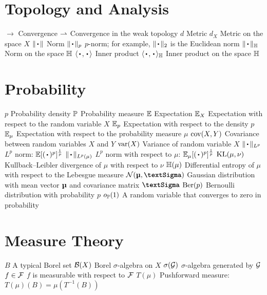 \documentclass[12pt]{report}
\begin{document}
\section*{Topology and Analysis}
\entry
    {$\to$}
    {Convergence}
\entry
    {$\weakto$}
    {Convergence in the weak topology}
\entry
    {$d$}
    {Metric}
\entry
    {$d_X$}
    {Metric on the space $X$}
\entry
    {$\norm{\vardot}$}
    {Norm}
\entry
    {$\norm{\vardot}_p$}
    {$p$-norm; for example, $\norm{\vardot}_2$ is the Euclidean norm}
\entry
    {$\norm{\vardot}_\Hb$}
    {Norm on the space $\Hb$}
\entry
    {$\lra{\vardot,\vardot}$}
    {Inner product}
\entry
    {$\lra{\vardot,\vardot}_\Hb$}
    {Inner product on the space $\Hb$}

\section*{Probability}
\entry
    {$p$}
    {Probability density}
\entry
    {$\P$}
    {Probability measure}
\entry
    {$\E$}
    {Expectation}
\entry
    {$\E_X$}
    {Expectation with respect to the random variable $X$}
\entry
    {$\E_p$}
    {Expectation with respect to the density $p$}
\entry
    {$\E_\mu$}
    {Expectation with respect to the probability measure $\mu$}
\entry
    {$\cov(X, Y)$}
    {Covariance between random variables $X$ and $Y$}
\entry
    {$\var(X)$}
    {Variance of random variable $X$}
\entry
    {$\norm{\vardot}_{L^p}$}
    {$L^p$ norm: $\E[(\vardot)^p]^{\frac1p}$}
\entry
    {$\norm{\vardot}_{L^p(\mu)}$}
    {$L^p$ norm with respect to $\mu$: $\E_\mu[(\vardot)^p]^{\frac1p}$}
\entry
    {$\KL(\mu, \nu)$}
    {Kullback--Leibler divergence of $\mu$ with respect to $\nu$}
\entry
    {$\Hb(\mu)$}
    {Differential entropy of $\mu$ with respect to the Lebesgue measure}
\entry
    {$\Normal(\vmu, \mSigma)$}
    {Gaussian distribution with mean vector $\vmu$ and covariance matrix $\mSigma$}
\entry
    {$\Ber(p)$}
    {Bernoulli distribution with probability $p$}
\entry
    {$o_\P(1)$}
    {A random variable that converges to zero in probability}

\section*{Measure Theory}
\entry
    {$B$}
    {A typical Borel set}
\entry
    {$\B(X)$}
    {Borel $\sigma$-algebra on $X$}
\entry
    {$\sigma(\G)$}
    {$\sigma$-algebra generated by $\G$}
\entry
    {$f \in \F$}
    {$f$ is measurable with respect to $\F$}
\entry
    {$T(\mu)$}
    {Pushforward measure: $T(\mu)(B) = \mu(T^{-1}(B))$}
\end{document}

